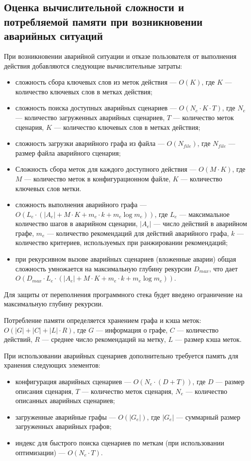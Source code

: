 \subsection*{Оценка вычислительной сложности и потребляемой памяти при возникновении аварийных ситуаций}
При возникновении аварийной ситуации и отказе пользователя от выполнения действия добавляются следующие вычислительные затраты:
\begin{itemize}
    \item сложность сбора ключевых слов из меток действия --- \(O(K)\), где \(K\) --- количество ключевых слов в метках действия;
    \item сложность поиска доступных аварийных сценариев --- \(O(N_{e} \cdot K \cdot T)\), где \(N_{e}\) --- количество загруженных аварийных сценариев, \(T\) --- количество меток сценария, \(K\) --- количество ключевых слов в метках действия;
    \item сложность загрузки аварийного графа из файла --- \(O(N_{file})\), где \(N_{file}\) --- размер файла аварийного сценария;
    \item Сложность сбора меток для каждого доступного действия --- \(O(M \cdot K)\), где \(M\) --- количество меток в конфигурационном файле, \(K\) --- количество ключевых слов метки. 
    \item сложность выполнения аварийного графа --- \(O(L_{e} \cdot (|A_{e}| + M \cdot K + m_{e} \cdot k + m_{e} \log m_{e}))\), где \(L_{e}\) --- максимальное количество шагов в аварийном сценарии, \(|A_{e}|\) --- число действий в аварийном графе, \(m_{e}\) --- количество рекомендаций для действий аварийного графа, $k$ --- количество критериев, используемых при ранжировании рекомендаций;
    \item при рекурсивном вызове аварийных сценариев (вложенные аварии) общая сложность умножается на максимальную глубину рекурсии \(D_{max}\), что дает \(O(D_{max} \cdot L_{e} \cdot (|A_{e}| + M \cdot K +  m_{e} \cdot k + m_{e} \log m_{e}))\).
\end{itemize}

Для защиты от переполнения программного стека будет введено ограничение на максимальную глубину рекурсии.

Потребление памяти определяется хранением графа и кэша меток: \(O(|G| + |C| + |L| \cdot R)\), где \(G\) --- информация о графе, \(C\) --- количество действий, \(R\) --- среднее число рекомендаций на метку, \(L\) --- размер кэша меток.

\clearpage
При использовании аварийных сценариев дополнительно требуется память для хранения следующих элементов:
\begin{itemize}
    \item конфигурация аварийных сценариев --- \(O(N_{e} \cdot (D + T))\), где \(D\) --- размер описания сценария, \(T\) --- количество меток сценария, $N_{e}$ --- количество описанных аварийных сценариев;
    \item загруженные аварийные графы --- \(O(|G_{e}|)\), где \(|G_{e}|\) --- суммарный размер загруженных аварийных графов;
    \item индекс для быстрого поиска сценариев по меткам (при использовании оптимизации) --- \(O(N_{e} \cdot T)\).
\end{itemize}

